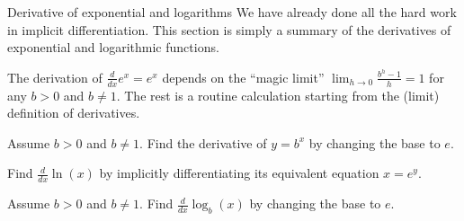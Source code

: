 \documentclass[../main.tex]{subfiles}
\begin{document}
\begin{lesson}{Derivative of exponential and logarithms}
  We have already done all the hard work in implicit differentiation.  This section is simply a summary of the derivatives of exponential and logarithmic functions. 

  The derivation of \(\frac{d}{dx} e^{x} = e^{x}\) depends on the ``magic limit'' \(\lim_{h \to 0} \frac{b^{h} - 1}{h} = 1\) for any \(b > 0\) and \(b \ne 1\). The rest is a routine calculation starting from the (limit) definition of derivatives. 

  \begin{example}
    Assume \(b > 0\) and \(b \ne 1\). Find the derivative of \(y = b^{x}\) by changing the base to \(e\).

  \end{example}

  \begin{example}
    Find \(\frac{d}{dx}\ln(x)\) by implicitly differentiating its equivalent equation \(x = e^{y}\).

  \end{example}

  \begin{example}
    Assume \(b > 0\) and \(b \ne 1\). Find \(\frac{d}{dx} \log_{b}(x)\) by changing the base to \(e\).

  \end{example}
\end{lesson}
\end{document}
